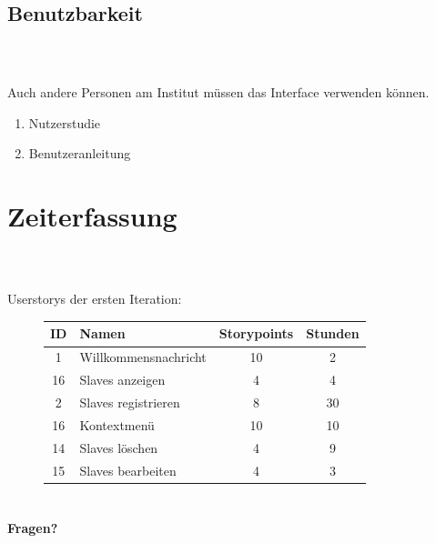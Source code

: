 \documentclass[accentcolor=tud1b,colorbacktitle,landscape,german,presentation]{tudbeamer}
\newcommand{\ftitle}{

	\frametitle{\insertsectionhead \\ {\small \insertsubsectionhead}}
}
\begin{document}
\subsection{Benutzbarkeit}
\begin{frame}
	\ftitle
	Auch andere Personen am Institut müssen das Interface verwenden können.
	\begin{enumerate}
		\item Nutzerstudie
		\item Benutzeranleitung
	\end{enumerate}
\end{frame}

\section{Zeiterfassung}
\begin{frame}
	\ftitle
	Userstorys der ersten Iteration:
	\begin{figure}
		\begin{tabular}{|c|l|c|c|}
			\hline
			ID&Namen&Storypoints&Stunden \\ \hline \hline
			1 &Willkommensnachricht&10&2 \\ \hline
			16&Slaves anzeigen&4&4\\ \hline
			2 &Slaves registrieren&8&30\\ \hline
			16&Kontextmenü&10&10\\ \hline
			14&Slaves löschen&4&9\\ \hline
			15&Slaves bearbeiten&4&3\\ \hline
		\end{tabular}
	\end{figure}

\end{frame}

\section{}
\begin{frame}
	\begin{center}
		\textbf{\LARGE{Fragen?}}
	\end{center}
\end{frame}
\end{document}
